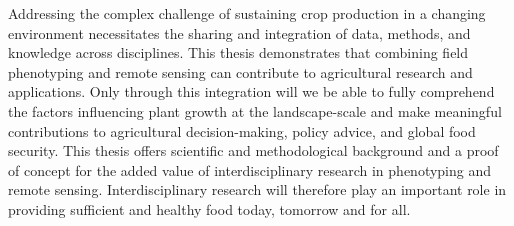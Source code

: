 Addressing the complex challenge of sustaining crop production in a changing environment necessitates the sharing and integration of data, methods, and knowledge across disciplines. This thesis demonstrates that combining field phenotyping and remote sensing can contribute to agricultural research and applications. Only through this integration will we be able to fully comprehend the factors influencing plant growth at the landscape-scale and make meaningful contributions to agricultural decision-making, policy advice, and global food security. This thesis offers scientific and methodological background and a proof of concept for the added value of interdisciplinary research in phenotyping and remote sensing. Interdisciplinary research will therefore play an important role in providing sufficient and healthy food today, tomorrow and for all.